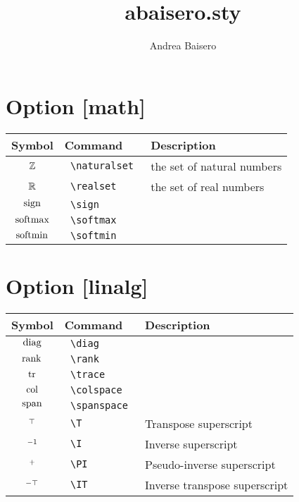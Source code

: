 \documentclass{article}
\begin{document}
\title{abaisero.sty}
\author{Andrea Baisero}

\maketitle

\section*{Option [math]}

\begin{tabular}{cll}
  Symbol & Command & Description \\
  \hline
  $\mathbb{Z}$ & \texttt{ \textbackslash naturalset } & the set of natural numbers \\
  $\mathbb{R}$ & \texttt{ \textbackslash realset } & the set of real numbers \\
  $\operatorname*{sign}$ & \texttt{ \textbackslash sign } & \\
  $\operatorname*{softmax}$ & \texttt{ \textbackslash softmax } & \\
  $\operatorname*{softmin}$ & \texttt{ \textbackslash softmin } & \\
\end{tabular}

\section*{Option [linalg]}

\begin{tabular}{cll}
  Symbol & Command & Description \\
  \hline
  $\operatorname*{diag}$ & \texttt{ \textbackslash diag } & \\
  $\operatorname*{rank}$ & \texttt{ \textbackslash rank } & \\
  $\operatorname*{tr}$ & \texttt{ \textbackslash trace } & \\
  $\operatorname*{col}$ & \texttt{ \textbackslash colspace } & \\
  $\operatorname*{span}$ & \texttt{ \textbackslash spanspace } & \\
  $^\top$ & \texttt{ \textbackslash T } & Transpose superscript \\
  $^{-1}$ & \texttt{ \textbackslash I } & Inverse superscript \\
  $^{+}$ & \texttt{ \textbackslash PI } & Pseudo-inverse superscript \\
  $^{-\top}$ & \texttt{ \textbackslash IT } & Inverse transpose superscript \\
\end{tabular}
\end{document}

